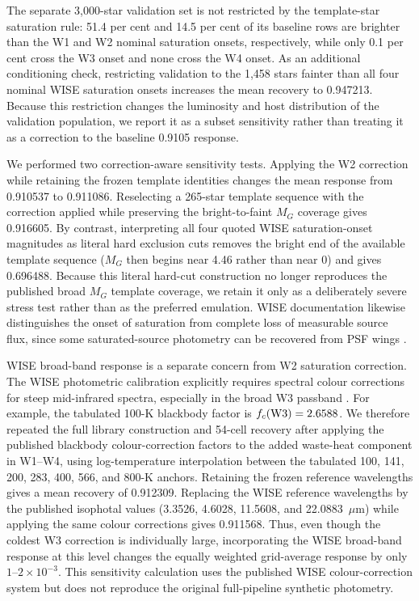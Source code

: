 \documentclass[fleqn,usenatbib]{mnras}
\begin{document}
The separate 3,000-star validation set is not restricted by the template-star saturation rule: 51.4 per cent and 14.5 per cent of its baseline rows are brighter than the W1 and W2 nominal saturation onsets, respectively, while only 0.1 per cent cross the W3 onset and none cross the W4 onset. As an additional conditioning check, restricting validation to the 1,458 stars fainter than all four nominal WISE saturation onsets increases the mean recovery to 0.947213. Because this restriction changes the luminosity and host distribution of the validation population, we report it as a subset sensitivity rather than treating it as a correction to the baseline 0.9105 response.

We performed two correction-aware sensitivity tests. Applying the W2 correction while retaining the frozen template identities changes the mean response from 0.910537 to 0.911086. Reselecting a 265-star template sequence with the correction applied while preserving the bright-to-faint $M_G$ coverage gives 0.916605. By contrast, interpreting all four quoted WISE saturation-onset magnitudes as literal hard exclusion cuts removes the bright end of the available template sequence ($M_G$ then begins near 4.46 rather than near 0) and gives 0.696488. Because this literal hard-cut construction no longer reproduces the published broad $M_G$ template coverage, we retain it only as a deliberately severe stress test rather than as the preferred emulation. WISE documentation likewise distinguishes the onset of saturation from complete loss of measurable source flux, since some saturated-source photometry can be recovered from PSF wings \citep{Cutri2012}.

WISE broad-band response is a separate concern from W2 saturation correction. The WISE photometric calibration explicitly requires spectral colour corrections for steep mid-infrared spectra, especially in the broad W3 passband \citep{Wright2010}. For example, the tabulated 100-K blackbody factor is $f_c({\rm W3})=2.6588$. We therefore repeated the full library construction and 54-cell recovery after applying the published blackbody colour-correction factors to the added waste-heat component in W1--W4, using log-temperature interpolation between the tabulated 100, 141, 200, 283, 400, 566, and 800-K anchors. Retaining the frozen reference wavelengths gives a mean recovery of 0.912309. Replacing the WISE reference wavelengths by the published isophotal values (3.3526, 4.6028, 11.5608, and 22.0883~$\mu$m) while applying the same colour corrections gives 0.911568. Thus, even though the coldest W3 correction is individually large, incorporating the WISE broad-band response at this level changes the equally weighted grid-average response by only $1$--$2\times10^{-3}$. This sensitivity calculation uses the published WISE colour-correction system but does not reproduce the original full-pipeline synthetic photometry.
\end{document}
